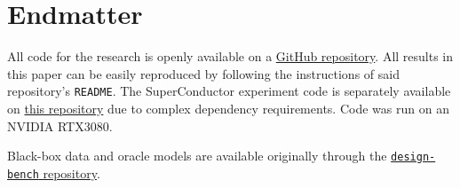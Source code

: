 \section*{Endmatter}

All code for the research is openly available on a
\href{https://github.com/bd3dowling/diffusion-research}{GitHub repository}.
All results in this paper can be easily reproduced by following the instructions of said
repository's \texttt{README}. The SuperConductor experiment code is separately available on
\href{https://github.com/bd3dowling/superconductor}{this repository} due to complex dependency
requirements. Code was run on an NVIDIA RTX3080.

Black-box data and oracle models are available originally through the
\href{https://github.com/brandontrabucco/design-bench}{\texttt{design-bench} repository}.

